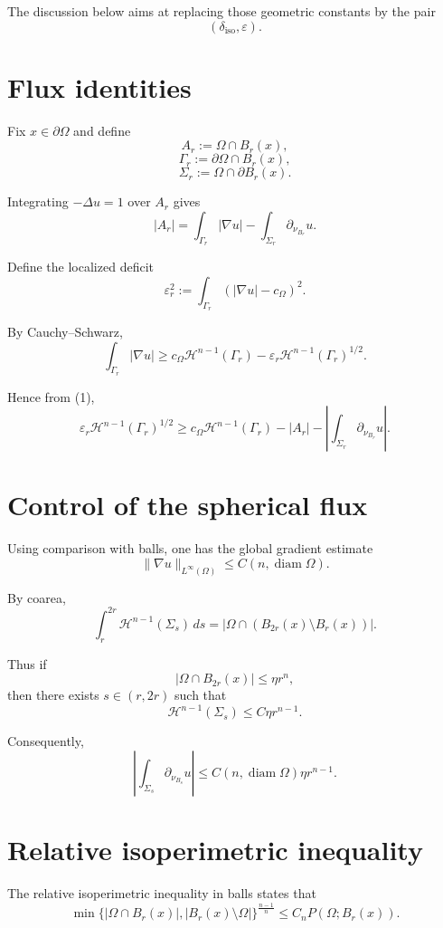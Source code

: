 \documentclass[11pt]{article}
\newcommand{\eps}{\varepsilon}
\newcommand{\deliso}{\delta_{\mathrm{iso}}}
\begin{document}
The discussion below aims at replacing those geometric constants
by the pair
\[
(\deliso,\eps).
\]

\section{Flux identities}

Fix $x\in \partial\Omega$ and define
\[
A_r:=\Omega\cap B_r(x),
\]
\[
\Gamma_r:=\partial\Omega\cap B_r(x),
\]
\[
\Sigma_r:=\Omega\cap \partial B_r(x).
\]

Integrating $-\Delta u=1$ over $A_r$ gives
\[
|A_r|
=
\int_{\Gamma_r} |\nabla u|
-
\int_{\Sigma_r} \partial_{\nu_{B_r}}u.
\tag{1}
\]

Define the localized deficit
\[
\eps_r^2
:=
\int_{\Gamma_r}
(|\nabla u|-c_\Omega)^2.
\]

By Cauchy--Schwarz,
\[
\int_{\Gamma_r} |\nabla u|
\ge
c_\Omega \mathcal H^{n-1}(\Gamma_r)
-
\eps_r
\mathcal H^{n-1}(\Gamma_r)^{1/2}.
\]

Hence from (1),
\[
\eps_r
\mathcal H^{n-1}(\Gamma_r)^{1/2}
\ge
c_\Omega \mathcal H^{n-1}(\Gamma_r)
-|A_r|
-
\left|
\int_{\Sigma_r}\partial_{\nu_{B_r}}u
\right|.
\tag{2}
\]

\section{Control of the spherical flux}

Using comparison with balls, one has the global gradient estimate
\[
\|\nabla u\|_{L^\infty(\Omega)}
\le
C(n,\operatorname{diam}\Omega).
\]

By coarea,
\[
\int_r^{2r}
\mathcal H^{n-1}(\Sigma_s)\,ds
=
|\Omega\cap(B_{2r}(x)\setminus B_r(x))|.
\]

Thus if
\[
|\Omega\cap B_{2r}(x)|
\le
\eta r^n,
\]
then there exists $s\in(r,2r)$ such that
\[
\mathcal H^{n-1}(\Sigma_s)
\le
C\eta r^{n-1}.
\]

Consequently,
\[
\left|
\int_{\Sigma_s}\partial_{\nu_{B_s}}u
\right|
\le
C(n,\operatorname{diam}\Omega)\eta r^{n-1}.
\tag{3}
\]

\section{Relative isoperimetric inequality}

The relative isoperimetric inequality in balls states that
\[
\min\{
|\Omega\cap B_r(x)|,
|B_r(x)\setminus \Omega|
\}^{\frac{n-1}{n}}
\le
C_n P(\Omega;B_r(x)).
\]
\end{document}
